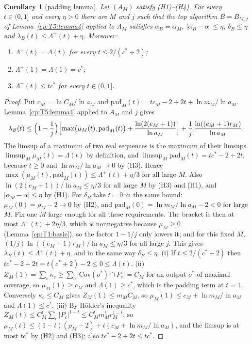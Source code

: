 \documentclass[11pt]{article}
\newtheorem{corollary}[theorem]{Corollary}
\theoremstyle{definition}
\theoremstyle{remark}
\newcommand{\abs}[1]{\lvert #1\rvert}
\newcommand{\Cov}{\mathrm{Cov}}               %
\newcommand{\lamB}{\lambda_B}                 %
\newcommand{\delB}{\delta_B}                  %
\newcommand{\alB}{\alpha_B}                   %
\newcommand{\Lam}{\Lambda}                    %
\newcommand{\Lamp}{\Lambda^{+}}               %
\newcommand{\cstar}{c^{*}}                    %
\newcommand{\Hcond}[1]{\textup{(H#1)}}        %
\begin{document}
\begin{corollary}[padding lemma]\label{cp:T5}
Let $(A_M)$ satisfy \Hcond1--\Hcond4. For every $t\in(0,1]$ and every $\eta>0$ there are $M$ and $j$ such that the top algorithm $B=B_{M,j}$ of Lemma~\ref{cp:T5:lemma4} applied to $A_M$ satisfies $\alB=\alpha_M$, $\abs{\alB-\alpha}\le\eta$, $\delB\le\eta$ and $\lamB(t)\le\Lamp(t)+\eta$. Moreover:
\begin{enumerate}[label=(\roman*)]
\item $\Lamp(t)=\Lam(t)$ for every $t\le2/(\cstar+2)$;
\item $\Lamp(1)=\Lam(1)=\cstar$;
\item $\Lamp(t)\le t\cstar$ for every $t\in(0,1]$.
\end{enumerate}
\end{corollary}

\begin{proof}
Put $c_M=\ln C_M/\ln a_M$ and $\mathrm{pad}_M(t)=tc_M-2+2t+\ln m_M/\ln a_M$. Lemma~\ref{cp:T5:lemma4} applied to $A_M$ and $j$ gives
\[
\lamB(t)\le\Bigl(1-\frac1j\Bigr)\Bigl[\max\bigl(\mu_M(t),\mathrm{pad}_M(t)\bigr)+\frac{\ln(2(e_M+1))}{\ln a_M}\Bigr]+\frac1j\,\frac{\ln((e_M+1)r_M)}{\ln a_M}.
\]
The limsup of a maximum of two real sequences is the maximum of their limsups. $\limsup_M\mu_M(t)=\Lam(t)$ by definition, and $\limsup_M\mathrm{pad}_M(t)=t\cstar-2+2t$, because $t\ge0$ and $\ln m_M/\ln a_M\to0$ by \Hcond3. Hence $\max(\mu_M(t),\mathrm{pad}_M(t))\le\Lamp(t)+\eta/3$ for all large $M$. Also $\ln(2(e_M+1))/\ln a_M\le\eta/3$ for all large $M$ by \Hcond3 and \Hcond1, and $\abs{\alpha_M-\alpha}\le\eta$ by \Hcond1. For $\delB$ take $t=0$ in the same bound: $\mu_M(0)=\rho_M-2\to0$ by \Hcond2, and $\mathrm{pad}_M(0)=\ln m_M/\ln a_M-2<0$ for large $M$. Fix one $M$ large enough for all these requirements. The bracket is then at most $\Lamp(t)+2\eta/3$, which is nonnegative because $\mu_M\ge0$ (Lemma~\ref{cp:T1:basic}), so the factor $1-1/j$ only lowers it; and for this fixed $M$, $(1/j)\ln((e_M+1)r_M)/\ln a_M\le\eta/3$ for all large $j$. This gives $\lamB(t)\le\Lamp(t)+\eta$, and in the same way $\delB\le\eta$.
(i) If $t\le2/(\cstar+2)$ then $t\cstar-2+2t=t(\cstar+2)-2\le0\le\Lam(t)$.
(ii) $Z_M(1)=\sum_c\kappa_c\ge\sum_c\abs{\Cov(o^*)\cap P_c}=C_M$ for an output $o^*$ of maximal coverage, so $\mu_M(1)\ge c_M$ and $\Lam(1)\ge\cstar$, which is the padding term at $t=1$. Conversely $\kappa_c\le C_M$ gives $Z_M(1)\le m_MC_M$, so $\mu_M(1)\le c_M+\ln m_M/\ln a_M$ and $\Lam(1)\le\cstar$.
(iii) By Hölder's inequality $Z_M(t)\le C_M^t\sum_c\abs{P_c}^{1-t}\le C_M^tm_M^tr_M^{1-t}$, so $\mu_M(t)\le(1-t)(\rho_M-2)+t(c_M+\ln m_M/\ln a_M)$, and the limsup is at most $t\cstar$ by \Hcond2 and \Hcond3; also $t\cstar-2+2t\le t\cstar$.
\end{proof}
\end{document}
